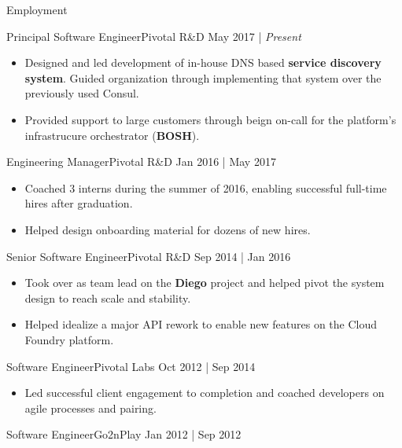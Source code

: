 \documentclass[]{mcdowellcv}
\begin{document}
\makeheader{}

\begin{cvsection}{Employment}
    \begin{cvsubsection}{Principal Software Engineer}{Pivotal R\&D }{May 2017 | \emph{Present}}
	\begin{itemize}%
	    \item Designed and led development of in-house DNS based \textbf{service discovery system}. Guided organization through implementing that system over the previously used Consul.
	    \item Provided support to large customers through beign on-call for the platform's infrastrucure orchestrator (\textbf{BOSH}).
	\end{itemize}
    \end{cvsubsection}
    \begin{cvsubsection}{Engineering Manager}{Pivotal R\&D }{Jan 2016 | May 2017}
	\begin{itemize}%
	    \item Coached 3 interns during the summer of 2016, enabling successful full-time hires after graduation.
	    \item Helped design onboarding material for dozens of new hires.
	\end{itemize}
    \end{cvsubsection}
    \begin{cvsubsection}{Senior Software Engineer}{Pivotal R\&D }{Sep 2014 | Jan 2016}
	\begin{itemize}%
	    \item Took over as team lead on the \textbf{Diego} project and helped pivot the system design to reach scale and stability.
	    \item Helped idealize a major API rework to enable new features on the Cloud Foundry platform.
	\end{itemize}
    \end{cvsubsection}
    \begin{cvsubsection}{Software Engineer}{Pivotal Labs }{Oct 2012 | Sep 2014}
	\begin{itemize}%
	    \item Led successful client engagement to completion and coached developers on agile processes and pairing.
	\end{itemize}
    \end{cvsubsection}
    \begin{cvsubsection}{Software Engineer}{Go2nPlay }{Jan 2012 | Sep 2012}

\end{cvsubsection}
\end{cvsection}
\end{document}
